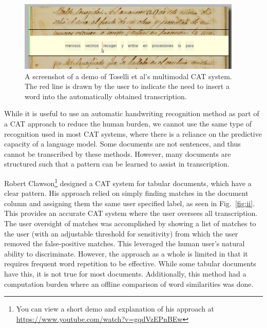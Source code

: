 \documentclass[ms]{byuprop}
\begin{document}
\begin{figure}[h]
    \centering
    \includegraphics[width=0.95\textwidth]{Toselli_multimodalCAT}
    \caption{A screenshot of a demo of Toselli et al's multimodal CAT system. The red line is drawn by the user to indicate the need to insert a word into the automatically obtained transcription.}
    \label{fig:Toselli_multimodalCAT}
\end{figure}

While it is useful to use an automatic handwriting recognition method as part of a CAT approach to reduce the human burden, we cannot use the same type of recognition used in most CAT systems, where there is a reliance on the predictive capacity of a language model. Some documents are not sentences, and thus cannot be transcribed by these methods. However, many documents are structured such that a pattern can be learned to assist in transcription.

Robert Clawson\cite{Clawson2014}\footnote{You can view a short demo and explanation of his approach at \url{https://www.youtube.com/watch?v=gqdVzEPnBEw}} designed a CAT system for tabular documents, which have a clear pattern. His approach relied on simply finding matches in the document column and assigning them the same user specified label, as seen in Fig.~\ref{fig:ii}. This provides an accurate CAT system where the user oversees all transcription. The user oversight of matches was accomplished by showing a list of matches to the user (with an adjustable threshold for sensitivity) from which the user removed the false-positive matches. This leveraged the human user's natural ability to discriminate. However, the approach as a whole is limited in that it requires frequent word repetition to be effective. While some tabular documents have this, it is not true for most documents. Additionally, this method had a computation burden where an offline comparison of word similarities was done.
\end{document}
